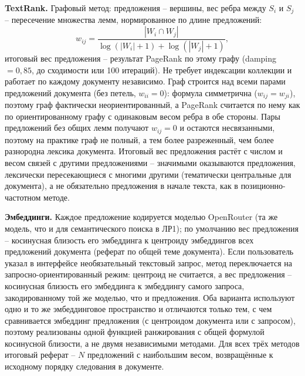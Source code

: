 \textbf{TextRank.} Графовый метод: предложения -- вершины, вес ребра
между $S_i$ и $S_j$ -- пересечение множества лемм, нормированное по
длине предложений:
\begin{equation}
  w_{ij} = \frac{|W_i \cap W_j|}{\log(|W_i|+1) + \log(|W_j|+1)},
\end{equation}
итоговый вес предложения -- результат PageRank по этому графу
(damping~$=0{,}85$, до сходимости или 100 итераций). Не требует
индексации коллекции и работает по каждому документу независимо. Граф
строится над всеми парами предложений документа (без петель, $w_{ii} =
0$): формула симметрична ($w_{ij} = w_{ji}$), поэтому граф фактически
неориентированный, а PageRank считается по нему как по ориентированному
графу с одинаковым весом ребра в обе стороны. Пары предложений без
общих лемм получают $w_{ij} = 0$ и остаются несвязанными, поэтому на
практике граф не полный, а тем более разреженный, чем более
разнородна лексика документа. Итоговый вес предложения растёт с числом
и весом связей с другими предложениями -- значимыми оказываются
предложения, лексически пересекающиеся с многими другими (тематически
центральные для документа), а не обязательно предложения в начале
текста, как в позиционно-частотном методе.

\textbf{Эмбеддинги.} Каждое предложение кодируется моделью OpenRouter
(та же модель, что и для семантического поиска в ЛР1); по умолчанию
вес предложения -- косинусная близость его эмбеддинга к центроиду
эмбеддингов всех предложений документа (реферат по общей теме
документа). Если пользователь указал в интерфейсе необязательный
текстовый запрос, метод переключается на запросно-ориентированный
режим: центроид не считается, а вес предложения -- косинусная
близость его эмбеддинга к эмбеддингу самого запроса, закодированному
той же моделью, что и предложения. Оба варианта используют одно и то
же эмбеддинговое пространство и отличаются только тем, с чем сравнивается
эмбеддинг предложения (с центроидом документа или с запросом), поэтому
реализованы одной функцией ранжирования с общей формулой косинусной
близости, а не двумя независимыми методами. Для всех трёх методов
итоговый реферат -- $N$ предложений с наибольшим весом, возвращённые к
исходному порядку следования в документе.

